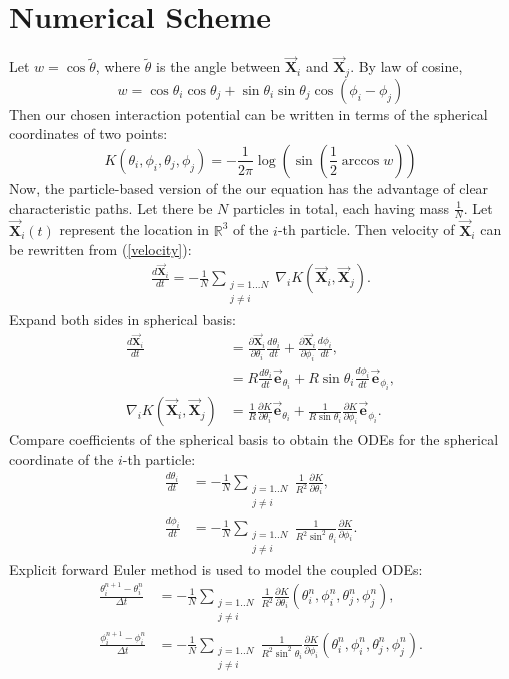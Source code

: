 \documentclass{article}
\newcommand{\p}{\partial}
\newcommand{\h}{\theta}
\newcommand{\hi}{\theta_i}
\newcommand{\hj}{\theta_j}
\newcommand{\ehi}{\vec{\mathbf{e}}_{\theta_i}}
\newcommand{\epi}{\vec{\mathbf{e}}_{\phi_i}}
\newcommand{\X}{\vec{\mathbf{X}}}
\newcommand{\R}{\mathbb{R}}
\begin{document}
\section{Numerical Scheme}
Let $w = \cos{\tilde{\h}}$, where $\tilde{\h}$ is the angle between $\X_i$ and $\X_j$. By law of cosine,
\begin{equation}
w = \cos{\h_i}\cos{\h_j} + \sin{\h_i}\sin{\h_j}\cos{(\phi_i - \phi_j)}
\end{equation}
Then our chosen interaction potential can be written in terms of the spherical coordinates of two points:
\begin{equation}
K(\hi,\phi_i,\hj,\phi_j) = - \frac{1}{2\pi} \log{\left( \sin{ \left( \frac{1}{2} \arccos{w}  \right)   }  \right)}
\end{equation}
Now, the particle-based version of the our equation has the advantage of clear characteristic paths. Let there be $N$ particles in total, each having mass $\frac{1}{N}$. Let $\X_i(t)$ represent the location in $\R^3$ of the $i$-th particle. Then velocity of $\X_i$ can be rewritten from (\ref{velocity}):
\begin{align*}
\frac{d \X_i}{dt} = -\frac{1}{N} \sum_{\substack{j = 1 ... N \\ j \ne i}} \nabla_i K(\X_i,\X_j).
\end{align*}
Expand both sides in spherical basis:
\begin{align*}
\frac{d\X_i}{dt} 
&= \frac{\p \X_i}{\p \h_i}\frac{d\h_i}{dt} + \frac{\p \X_i}{\p \phi_i}\frac{d\phi_i}{dt},\\[0.8ex]
&= R \frac{d \hi}{dt}\ehi + R\sin{\hi} \frac{d \phi_i}{dt} \epi,\\[0.8ex]
\nabla_i K (\X_i,\X_j) &= \frac{1}{R} \frac{\p K}{\p \hi} \ehi + \frac{1}{R\sin{\hi}} \frac{\p K}{\p \phi_i}\epi.
\end{align*}
Compare coefficients of the spherical basis to obtain the ODEs for the spherical coordinate of the $i$-th particle:
\begin{align}
\frac{d \hi}{dt} &= -\frac{1}{N}\sum_{\substack{j=1..N \\ j \neq i}} {\frac{1}{R^2} \frac{\p K}{\p \hi} },\\
\frac{d \phi_i}{dt} &=-\frac{1}{N}\sum_{\substack{j=1..N \\ j \neq i}}{ \frac{1}{R^2\sin^2{\hi}} \frac{\p K}{\p \phi_i}}.
\end{align}
Explicit forward Euler method is used to model the coupled ODEs:
\begin{align*}
\frac{\h_i^{n+1} - \h_i^n}{\Delta t} &= -\frac{1}{N}\sum_{\substack{j=1..N \\ j \neq i}} \frac{1}{R^2} \frac{\p K}{\p \hi} (\h_i^n,\phi_i^n,\h_j^n,\phi_j^n),\\
\frac{\phi_i^{n+1} - \phi_i^n}{\Delta t} &=-\frac{1}{N}\sum_{\substack{j=1..N \\ j \neq i}}  \frac{1}{R^2\sin^2{\hi}} \frac{\p K}{\p \phi_i} (\h_i^n,\phi_i^n,\h_j^n,\phi_j^n).
\end{align*}
\end{document}
